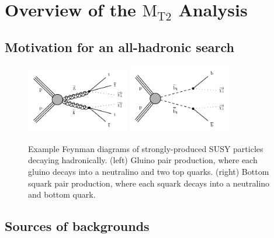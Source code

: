 \chapter{Overview of the $\text{M}_\text{T2}$ Analysis}

\section{Motivation for an all-hadronic search}

\begin{figure}[h]
  \begin{center}
    \includegraphics[width=0.40\textwidth]{figs/susy_diagrams/T1tttt.pdf}
    \includegraphics[width=0.40\textwidth]{figs/susy_diagrams/T2bb.pdf}
    \caption{Example Feynman diagrams of strongly-produced SUSY particles decaying hadronically.
      (left) Gluino pair production, where each gluino decays into a neutralino and two top quarks.
      (right) Bottom squark pair production, where each squark decays into a neutralino and bottom quark.
            }
    \label{Fig:example_susy_feyn}
  \end{center}
\end{figure}

\section{Sources of backgrounds}
\label{sec:mt2_backgrounds}

